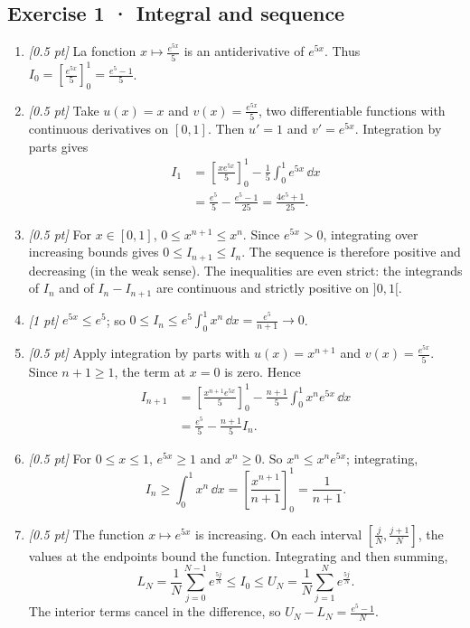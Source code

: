 \subsection*{Exercise 1 · Integral and sequence}\begin{enumerate}

\item \textit{[0.5 pt]} La fonction $x\mapsto \frac{e^{5x}}{5}$ is an antiderivative of $e^{5x}$. Thus $I_0=[\frac{e^{5x}}{5}]_0^1=\frac{e^{5}-1}{5}$.

\item \textit{[0.5 pt]} Take $u(x)=x$ and $v(x)=\frac{e^{5x}}{5}$, two differentiable functions with continuous derivatives on $[0,1]$. Then $u'=1$ and $v'=e^{5x}$. Integration by parts gives
\[\begin{aligned}I_1&=\left[\frac{xe^{5x}}{5}\right]_0^1-\frac{1}{5}\int_0^1e^{5x}\,\dd x\\&=\frac{e^{5}}{5}-\frac{e^{5}-1}{25}=\frac{4e^{5}+1}{25}.\end{aligned}\]

\item \textit{[0.5 pt]} For $x\in[0,1]$, $0\le x^{n+1}\le x^n$. Since $e^{5x}>0$, integrating over increasing bounds gives $0\le I_{n+1}\le I_n$. The sequence is therefore positive and decreasing (in the weak sense). The inequalities are even strict: the integrands of $I_n$ and of $I_n-I_{n+1}$ are continuous and strictly positive on $]0,1[$.

\item \textit{[1 pt]} $e^{5x}\le e^{5}$; so $0\le I_n\le e^{5}\int_0^1x^n\,\dd x=\frac{e^{5}}{n+1}\to0$.

\item \textit{[0.5 pt]} Apply integration by parts with $u(x)=x^{n+1}$ and $v(x)=\frac{e^{5x}}{5}$. Since $n+1\ge1$, the term at $x=0$ is zero. Hence
\[\begin{aligned}I_{n+1}&=\left[\frac{x^{n+1}e^{5x}}{5}\right]_0^1-\frac{n+1}{5}\int_0^1x^ne^{5x}\,\dd x\\&=\frac{e^{5}}{5}-\frac{n+1}{5}I_n.\end{aligned}\]

\item \textit{[0.5 pt]} For $0\le x\le1$, $e^{5x}\ge1$ and $x^n\ge0$. So $x^n\le x^ne^{5x}$; integrating,
\[I_n\ge\int_0^1x^n\,\dd x=\left[\frac{x^{n+1}}{n+1}\right]_0^1=\frac{1}{n+1}.\]

\item \textit{[0.5 pt]} The function $x\mapsto e^{5x}$ is increasing. On each interval $[\frac{j}{N},\frac{j+1}{N}]$, the values at the endpoints bound the function. Integrating and then summing,
\[L_N=\frac{1}{N}\sum_{j=0}^{N-1}e^{\frac{5j}{N}}\le I_0\le U_N=\frac{1}{N}\sum_{j=1}^Ne^{\frac{5j}{N}}.\]
The interior terms cancel in the difference, so $U_N-L_N=\frac{e^{5}-1}{N}$.


\end{enumerate}
